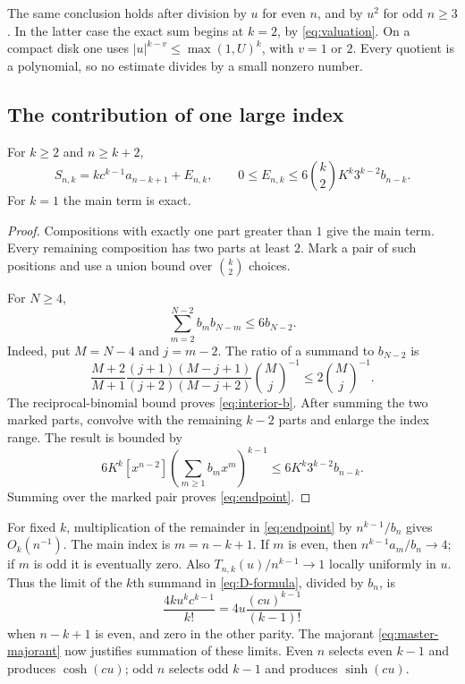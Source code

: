The same conclusion holds after division by $u$ for even $n$, and by
$u^2$ for odd $n\ge3$. In the latter case the exact sum begins at $k=2$,
by \eqref{eq:valuation}. On a compact disk one uses
$|u|^{k-v}\le\max(1,U)^k$, with $v=1$ or $2$. Every quotient is a
polynomial, so no estimate divides by a small nonzero number.

\subsection{The contribution of one large index}

\begin{lemma}\label{lem:endpoint}
For $k\ge2$ and $n\ge k+2$,
\begin{equation}\label{eq:endpoint}
 S_{n,k}=k c^{k-1}a_{n-k+1}+E_{n,k},\qquad
 0\le E_{n,k}\le6\binom{k}{2}K^k3^{k-2}b_{n-k}.
\end{equation}
For $k=1$ the main term is exact.
\end{lemma}
\begin{proof}
Compositions with exactly one part greater than $1$ give the main term.
Every remaining composition has two parts at least $2$. Mark a pair of
such positions and use a union bound over $\binom{k}{2}$ choices.

For $N\ge4$,
\begin{equation}\label{eq:interior-b}
 \sum_{m=2}^{N-2}b_mb_{N-m}\le6b_{N-2}.
\end{equation}
Indeed, put $M=N-4$ and $j=m-2$. The ratio of a summand to $b_{N-2}$ is
\[
 \frac{M+2}{M+1}
 \frac{(j+1)(M-j+1)}{(j+2)(M-j+2)}\binom Mj^{-1}
 \le2\binom Mj^{-1}.
\]
The reciprocal-binomial bound proves \eqref{eq:interior-b}.
After summing the two marked parts, convolve with the remaining $k-2$
parts and enlarge the index range. The result is bounded by
\[
 6K^k[x^{n-2}]\left(\sum_{m\ge1}b_mx^m\right)^{k-1}
 \le6K^k3^{k-2}b_{n-k}.
\]
Summing over the marked pair proves \eqref{eq:endpoint}.
\end{proof}

For fixed $k$, multiplication of the remainder in \eqref{eq:endpoint} by
$n^{k-1}/b_n$ gives $O_k(n^{-1})$. The main index is $m=n-k+1$.
If $m$ is even, then
$n^{k-1}a_m/b_n\to4$; if $m$ is odd it is eventually zero.
Also $T_{n,k}(u)/n^{k-1}\to1$ locally uniformly in $u$.
Thus the limit of the $k$th summand in \eqref{eq:D-formula}, divided by
$b_n$, is
\begin{equation}\label{eq:fixed-k-limit}
 \frac{4k u^kc^{k-1}}{k!}
 =4u\frac{(cu)^{k-1}}{(k-1)!}
\end{equation}
when $n-k+1$ is even, and zero in the other parity.
The majorant \eqref{eq:master-majorant} now justifies summation of these
limits. Even $n$ selects even $k-1$ and produces $\cosh(cu)$; odd $n$
selects odd $k-1$ and produces $\sinh(cu)$.

